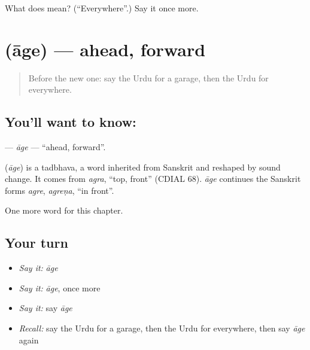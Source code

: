 \begin{tcolorbox}[breakable,colback=teal!4,colframe=teal!35!black,title={Before you move on}]
What does   mean? (\textquotedblleft{}Everywhere\textquotedblright{}.) Say it once more.
\end{tcolorbox}
\section[\texorpdfstring{\ur{آگے} (āge)}{آگے (āge)}]{ (āge) — ahead, forward}

\label{lesson:UR-C246-age}



\begin{quote}
Before the new one: say the Urdu for a garage, then the Urdu for everywhere.
\end{quote}

\subsection*{You'll want to know: }
\textbf{} — \emph{āge} — \textquotedblleft{}ahead, forward\textquotedblright{}.

\begin{cousinweb}
\textbf{} (\emph{āge}) is a tadbhava, a word inherited from Sanskrit and reshaped by sound change. It comes from \emph{agra}, \textquotedblleft{}top, front\textquotedblright{} (CDIAL 68). \emph{āge} continues the Sanskrit forms \emph{agre}, \emph{agreṇa}, \textquotedblleft{}in front\textquotedblright{}.
\end{cousinweb}

\begin{grammarlens}[title={What you've built}]
One more word for this chapter.
\end{grammarlens}

\subsection*{Your turn}
\begin{itemize}
\raggedright
  \item \emph{Say it:} \emph{āge}
  \item \emph{Say it:} \emph{āge}, once more
  \item \emph{Say it:} say \emph{āge}
  \item \emph{Recall:} say the Urdu for a garage, then the Urdu for everywhere, then say \emph{āge} again
\end{itemize}

